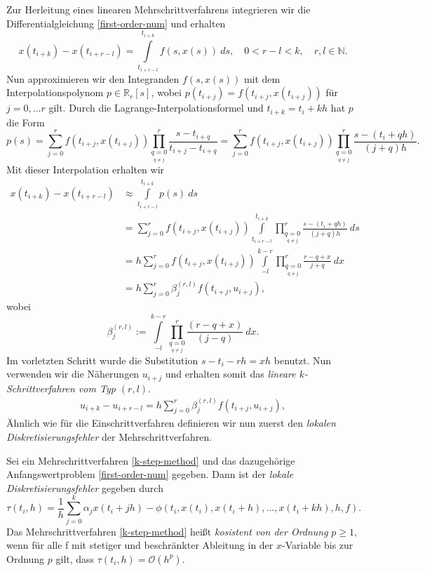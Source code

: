 Zur Herleitung eines linearen Mehrschrittverfahrens integrieren wir die Differentialgleichung \eqref{first-order-num}
und erhalten
\[
    x(t_{i+k}) - x(t_{i+r-l}) = \int\limits_{t_{i+r-l}}^{t_{i+k}} f(s,x(s))\ ds, \quad 0<r-l<k, \quad r,l \in \mathbb{N}.
\]
Nun approximieren wir den Integranden $f(s,x(s))$ mit dem Interpolationspolynom $p \in \mathbb{R}_r[s]$, wobei
$p(t_{i+j})=f(t_{i+j},x(t_{i+j}))$ für $j=0, \dots r$ gilt. Durch die Lagrange-Interpolationsformel
\cite[Kapitel 7]{p.deuflharda.hohmannNumerischeMathematik2018} und $t_{i+k}=t_i+kh$ hat $p$ die Form
\[
    p(s)=\sum_{j=0}^{r}f(t_{i+j},x(t_{i+j})) \prod\limits_{\underset{q \neq j}{q=0}}^{r} \frac{s-t_{i+q}}{t_{i+j}-t_{i+q}}
    =\sum_{j=0}^{r}f(t_{i+j},x(t_{i+j})) \prod\limits_{\underset{q \neq j}{q=0}}^{r} \frac{s-(t_i+qh)}{(j+q)h}.
\]
Mit dieser Interpolation erhalten wir
\begin{align*}
    x(t_{i+k}) - x(t_{i+r-l}) &\approx \int\limits_{t_{i+r-l}}^{t_{i+k}} p(s)\ ds \\
    &=\sum_{j=0}^{r}f(t_{i+j},x(t_{i+j})) \int\limits_{t_{i+r-l}}^{t_{i+k}}
    \prod\limits_{\underset{q \neq j}{q=0}}^{r} \frac{s-(t_i+qh)}{(j+q)h}\ ds \\
    &= h \sum_{j=0}^{r}f(t_{i+j},x(t_{i+j})) \int\limits_{-l}^{k-r}
    \prod\limits_{\underset{q \neq j}{q=0}}^{r} \frac{r-q+x}{j+q}\ dx\\
    &=h \sum_{j=0}^{r} \beta_j^{(r,l)} f(t_{i+j},u_{i+j}),
\end{align*}
wobei
\[
    \beta_j^{(r,l)} := \int\limits_{-l}^{k-r} \prod\limits_{\underset{q \neq j}{q=0}}^{r} \frac{(r-q+x)}{(j-q)}\ dx.
\]
Im vorletzten Schritt wurde die Substitution $s-t_i-rh = xh$ benutzt. Nun verwenden wir die Näherungen $u_{i+j}$ und
erhalten somit das \textit{lineare $k$-Schrittverfahren vom Typ $(r,l)$}.
\begin{align}
    \label{k-step-rl}
    u_{i+k}-u_{i+r-l} = h \sum_{j=0}^{r} \beta_j^{(r,l)} f(t_{i+j},u_{i+j}),
\end{align}
Ähnlich wie für die Einschrittverfahren definieren wir nun zuerst den {\em lokalen Diskretisierungsfehler} der
Mehrschrittverfahren.
\begin{definition}
    Sei ein Mehrschrittverfahren \eqref{k-step-method} und das dazugehörige Anfangswertproblem \eqref{first-order-num}
    gegeben. Dann ist der {\em lokale Diskretisierungsfehler} gegeben durch
    \[
        \tau(t_i,h) = \frac{1}{h} \sum_{j=0}^{k} \alpha_j x(t_i + jh) -
        \phi (t_i,x(t_i), x(t_i+h), \dots, x(t_i+kh),h,f).
    \]
    Das Mehrschrittverfahren \eqref{k-step-method} heißt {\em kosistent von der Ordnung} $p\geq 1$, wenn für alle f mit
    stetiger und beschränkter Ableitung in der $x$-Variable bis zur Ordnung $p$ gilt, dass
    $\tau(t_i,h) = \mathcal{O}(h^p)$.
\end{definition}
